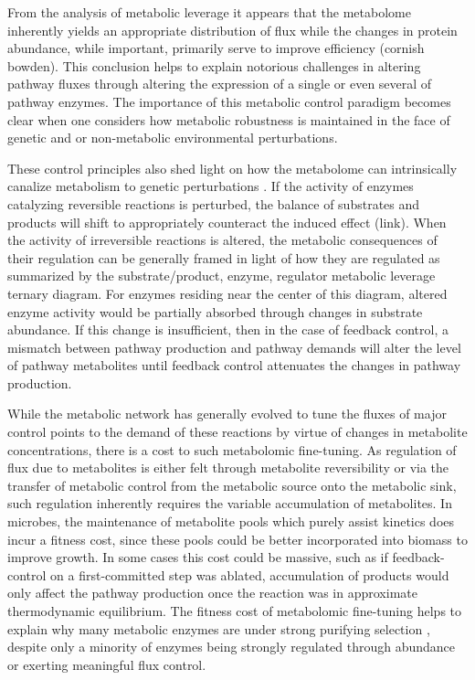From the analysis of metabolic leverage it appears that the metabolome inherently yields an appropriate distribution of flux while the changes in protein abundance, while important, primarily serve to improve efficiency (cornish bowden). This conclusion helps to explain notorious challenges in altering pathway fluxes through altering the expression of a single or even several of pathway enzymes. The importance of this metabolic control paradigm becomes clear when one considers how metabolic robustness is maintained in the face of genetic and or non-metabolic environmental perturbations.

These control principles also shed light on how the metabolome can intrinsically canalize metabolism to genetic perturbations \cite{Larhlimi:2011ds}. If the activity of enzymes catalyzing reversible reactions is perturbed, the balance of substrates and products will shift to appropriately counteract the induced effect (link). When the activity of irreversible reactions is altered, the metabolic consequences of their regulation can be generally framed in light of how they are regulated as summarized by the substrate/product, enzyme, regulator metabolic leverage ternary diagram. For enzymes residing near the center of this diagram, altered enzyme activity would be partially absorbed through changes in substrate abundance. If this change is insufficient, then in the case of feedback control, a mismatch between pathway production and pathway demands will alter the level of pathway metabolites until feedback control attenuates the changes in pathway production.

While the metabolic network has generally evolved to tune the fluxes of major control points to the demand of these reactions by virtue of changes in metabolite concentrations, there is a cost to such metabolomic fine-tuning.  As regulation of flux due to metabolites is either felt through metabolite reversibility or via the transfer of metabolic control from the metabolic source onto the metabolic sink, such regulation inherently requires the variable accumulation of metabolites. In microbes, the maintenance of metabolite pools which purely assist kinetics does incur a fitness cost, since these pools could be better incorporated into biomass to improve growth. In some cases this cost could be massive, such as if feedback-control on a first-committed step was ablated, accumulation of products would only affect the pathway production once the reaction was in approximate thermodynamic equilibrium. The fitness cost of metabolomic fine-tuning helps to explain why many metabolic enzymes are under strong purifying selection \cite{Greenberg:2008uy}, despite only a minority of enzymes being strongly regulated through abundance or exerting meaningful flux control.

